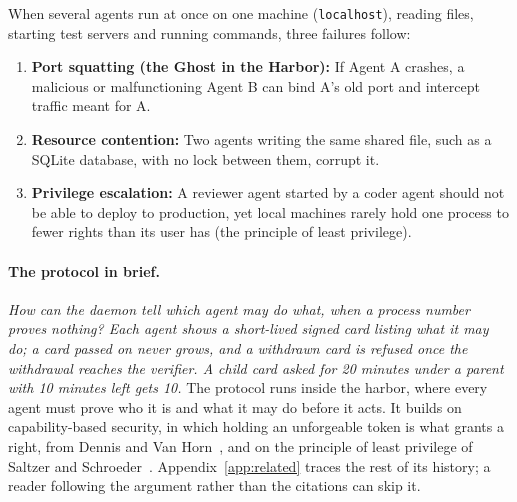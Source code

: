 \documentclass[11pt,a4paper]{article}
\theoremstyle{definition}
\begin{document}
When several agents run at once on one machine (\texttt{localhost}), reading files, starting test servers and running commands, three failures follow:
\begin{enumerate}
  \item \textbf{Port squatting (the Ghost in the Harbor):} If Agent A crashes, a malicious or malfunctioning Agent B can bind A's old port and intercept traffic meant for A.
  \item \textbf{Resource contention:} Two agents writing the same shared file, such as a SQLite database, with no lock between them, corrupt it.
  \item \textbf{Privilege escalation:} A reviewer agent started by a coder agent should not be able to deploy to production, yet local machines rarely hold one process to fewer rights than its user has (the principle of least privilege).
\end{enumerate}
\paragraph{The protocol in brief.} \emph{How can the daemon tell which agent may do what, when a process number proves nothing? Each agent shows a short-lived signed card listing what it may do; a card passed on never grows, and a withdrawn card is refused once the withdrawal reaches the verifier. A child card asked for 20 minutes under a parent with 10 minutes left gets 10.}
The protocol runs inside the harbor, where every agent must prove who it is and what it may do before it acts. It builds on capability-based security, in which holding an unforgeable token is what grants a right, from Dennis and Van Horn~, and on the principle of least privilege of Saltzer and Schroeder~. Appendix~\ref{app:related} traces the rest of its history; a reader following the argument rather than the citations can skip it.
\end{document}
